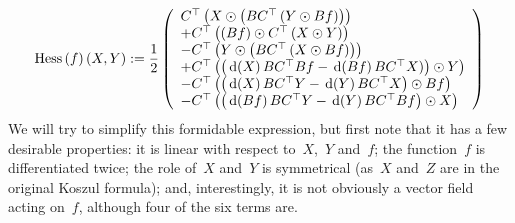 \begin{equation*}
	\mathrm{Hess}\left(f\right)(X,Y) :=
	\frac12\left(
		\begin{array}{l}
		C^\top\left(X\odot\left(BC^\top\left(Y\odot Bf\right)\right)\right)
		\\
		+
		C^\top\left(\left( Bf \right)\odot C^\top\left(X\odot Y\right)\right)
		\\
		-
		C^\top\left(Y\odot\left(BC^\top\left(X\odot Bf\right)\right)\right)
		\\
		+
		C^\top\left(\left(
				\,\mathrm{d}\!\left(X\right)BC^\top Bf-\,\mathrm{d}\!\left(Bf\right)BC^\top X
		) \right)\odot Y\right)
		\\
		-
		C^\top\left(
			\left(
				\,\mathrm{d}\!\left(X\right)BC^\top Y-\,\mathrm{d}\!\left(Y\right)BC^\top X
			\right)
			\odot Bf\right)
		\\
		-
		C^\top\left(
			\left(
				\,\mathrm{d}\!\left(Bf\right)BC^\top Y-\,\mathrm{d}\!\left(Y\right)BC^\top Bf
			\right)
		\odot X \right)
		\end{array}
	\right)
\end{equation*}
We will try to simplify this formidable expression, but first note that it
has a few desirable properties:  it is linear with respect to~$X$,~$Y$
and~$f$; the function~$f$ is differentiated twice; the role of~$X$ and~$Y$ is
symmetrical (as~$X$ and~$Z$ are in the original Koszul formula); and,
interestingly, it is not obviously a vector field acting on~$f$, although
four of the six terms are.


